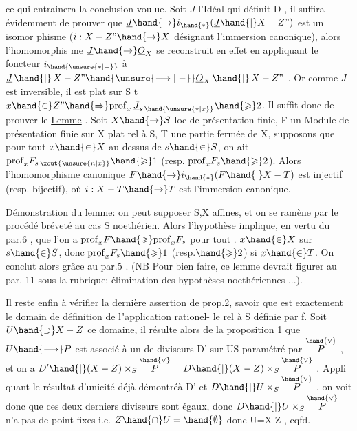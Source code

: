 
\margin{$|$}\margin{$\wr$}ce qui entrainera la conclusion voulue. Soit $\underline{J}$ l'Idéal qui définit
D , il suffira évidemment de prouver que $\underline{J}\hand{\to} i_{\hand{*}}(\underline{J}\hand{|}X-Z")$ est un isomor
phisme ($i:X-Z"\hand{\to} X$ désignant l'immersion canonique), alors l'homomorphis
me $\underline{J}\hand{\to}\underline{O}_X$ se reconstruit en effet en appliquant le foncteur $i_{\hand{\unsure{*|\relbar}}}$ à
$\underline{J}\,\hand{|}\,X-Z" \hand{\unsure{\longrightarrow|\relbar}} \underline{O}_X\,\hand{|}\,X-Z"$ . Or comme $\underline{J}$ est inversible, il est plat sur S t
 $x\hand{\in} Z" \hand{\Rightarrow} \mathrm{prof}_x\,\underline{J}_{s\,\hand{\unsure{*|x}}} \hand{\geqslant} 2$. Il suffit donc de prouver le
\uline{Lemme} . Soit $X\hand{\to} S$ loc de présentation finie, F un Module de présentation
finie sur X plat rel à S, T une partie fermée de X, supposons que pour
tout $x\hand{\in} X$ au dessus de $s\hand{\in} S$, on ait \hand{\unsure{/}} $\mathrm{prof}_x F_{s\,\xout{\unsure{n|x}}}\hand{\geqslant} 1$ (resp. $\mathrm{prof}_x F_s \hand{\geqslant} 2$).
Alors l'homomorphisme canonique $F\hand{\to} i_{\hand{*}}(F\hand{|}X-T)$ est injectif (resp.
bijectif), où $i:X-T\hand{\to} T$ est l'immersion canonique.

Démonstration du lemme: on peut supposer S,X affines, et on se
ramène par le procédé bréveté au cas S noethérien. Alors l'hypothèse
implique, en vertu du par.6 , que l'on a $\mathrm{prof}_x F \hand{\geqslant} \mathrm{prof}_x F_s$ pour tout .
$x\hand{\in} X$ sur $s\hand{\in} S$, donc $\mathrm{prof}_x F_s \hand{\geqslant} 1$ (resp.$\hand{\geqslant} 2$) si $x\hand{\in} T$. On conclut alors
grâce au par.5 . (NB Pour bien faire, ce lemme devrait figurer au par.
11 sous la rubrique; élimination des hypothèses noethériennes ...).

Il reste enfin à vérifier la dernière assertion de prop.2, savoir
que  est exactement le domain de définition de l"application rationel-%
le rel à S définie par f. Soit $U\hand{\supset} X-Z$ ce domaine, il résulte alors de
la proposition 1 que $U\hand{\longrightarrow} P$ est associé à un de diviseurs
D' sur US paramétré par $\overset{\hand{\vee}}{P}$ , et on a $D'\hand{|}(X-Z)\times_S\overset{\hand{\vee}}{P} = D\hand{|}(X-Z)\times_S\overset{\hand{\vee}}{P}$ . Appli
quant le résultat d'unicité \hand{(}déjà démontré\hand{)}à D' et $D\hand{|}U\times_S\overset{\hand{\vee}}{P}$ , on voit donc
que ces deux derniers diviseurs sont égaux, donc $D\hand{|}U\times_S\overset{\hand{\vee}}{P}$ n'a pas de
point fixes i.e. $Z\hand{\cap} U=\hand{\emptyset}$ donc U=X-Z , cqfd.

